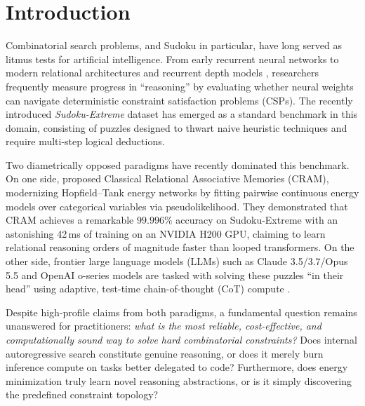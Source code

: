 \documentclass{article} %
\begin{document}
\section{Introduction}
\label{sec:intro}

Combinatorial search problems, and Sudoku in particular, have long served as litmus tests for artificial intelligence. From early recurrent neural networks \citep{hopfield1985neural} to modern relational architectures \citep{palm2018recurrent,wang2019satnet} and recurrent depth models \citep{schwarzschild2021can,bansal2022end}, researchers frequently measure progress in ``reasoning'' by evaluating whether neural weights can navigate deterministic constraint satisfaction problems (CSPs). The recently introduced \textit{Sudoku-Extreme} dataset \citep{sapient2024sudokuextreme} has emerged as a standard benchmark in this domain, consisting of puzzles designed to thwart naive heuristic techniques and require multi-step logical deductions.

Two diametrically opposed paradigms have recently dominated this benchmark. On one side, \citet{hoover2026classical} proposed Classical Relational Associative Memories (CRAM), modernizing Hopfield--Tank energy networks \citep{hopfield1985neural} by fitting pairwise continuous energy models over categorical variables via pseudolikelihood. They demonstrated that CRAM achieves a remarkable $99.996\%$ accuracy on Sudoku-Extreme with an astonishing 42\,ms of training on an NVIDIA H200 GPU, claiming to learn relational reasoning orders of magnitude faster than looped transformers. On the other side, frontier large language models (LLMs) such as Claude 3.5/3.7/Opus 5.5 and OpenAI o-series models are tasked with solving these puzzles ``in their head'' using adaptive, test-time chain-of-thought (CoT) compute \citep{wei2022chain,nye2021show,snell2024scaling}. 

Despite high-profile claims from both paradigms, a fundamental question remains unanswered for practitioners: \textit{what is the most reliable, cost-effective, and computationally sound way to solve hard combinatorial constraints?} Does internal autoregressive search constitute genuine reasoning, or does it merely burn inference compute on tasks better delegated to code? Furthermore, does energy minimization truly learn novel reasoning abstractions, or is it simply discovering the predefined constraint topology?
\end{document}
